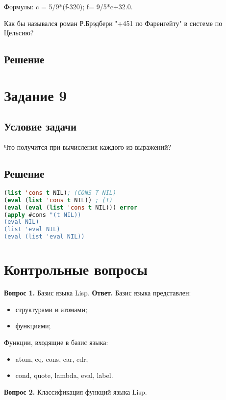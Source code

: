 Формулы:  
c = 5/9*(f-320); f= 9/5*c+32.0.  

Как бы назывался роман Р.Брэдбери "+451 по Фаренгейту" в системе по Цельсию?  

\subsection*{Решение}


\section*{Задание 9}
\subsection*{Условие задачи}
Что получится при вычисления каждого из выражений?

\subsection*{Решение}
\begin{lstlisting}[label=7xd,caption=Решение задания №9, language=lisp]
(list 'cons t NIL); (CONS T NIL)
(eval (list 'cons t NIL)) ; (T)
(eval (eval (list 'cons t NIL))) error
(apply #cons "(t NIL)) 
(eval NIL)
(list 'eval NIL) 
(eval (list 'eval NIL))
\end{lstlisting}

\section*{Контрольные вопросы}

\textbf{Вопрос 1.} Базис языка Lisp. \newline
\indent\textbf{Ответ. }
Базис языка представлен:
\begin{itemize}
	\item структурами и атомами;
	\item функциями;
\end{itemize}

Функции, входящие в базис языка:
\begin{itemize}
	\item atom, eq, cons, car, cdr;
	\item cond, quote, lambda, eval, label.
\end{itemize}


\textbf{Вопрос 2.} Классификация функций языка Lisp.
	
